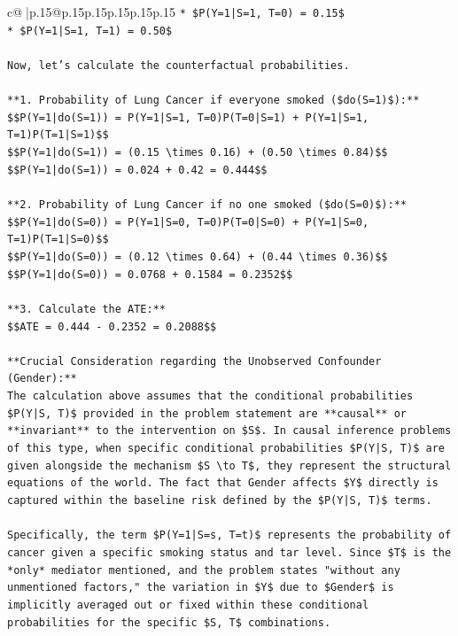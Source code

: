 \documentclass{article}
\begin{document}
{\begin{supertabular}{c@{$\;$}|p{.15\linewidth}@{}p{.15\linewidth}p{.15\linewidth}p{.15\linewidth}p{.15\linewidth}p{.15\linewidth}}
{{{\texttt{*   \$P(Y=1|S=1, T=0) = 0.15\$} \\
\texttt{*   \$P(Y=1|S=1, T=1) = 0.50\$} \\
\\ 
\texttt{Now, let's calculate the counterfactual probabilities.} \\
\\ 
\texttt{**1. Probability of Lung Cancer if everyone smoked (\$do(S=1)\$):**} \\
\texttt{\$\$P(Y=1|do(S=1)) = P(Y=1|S=1, T=0)P(T=0|S=1) + P(Y=1|S=1, T=1)P(T=1|S=1)\$\$} \\
\texttt{\$\$P(Y=1|do(S=1)) = (0.15 \textbackslash{}times 0.16) + (0.50 \textbackslash{}times 0.84)\$\$} \\
\texttt{\$\$P(Y=1|do(S=1)) = 0.024 + 0.42 = 0.444\$\$} \\
\\ 
\texttt{**2. Probability of Lung Cancer if no one smoked (\$do(S=0)\$):**} \\
\texttt{\$\$P(Y=1|do(S=0)) = P(Y=1|S=0, T=0)P(T=0|S=0) + P(Y=1|S=0, T=1)P(T=1|S=0)\$\$} \\
\texttt{\$\$P(Y=1|do(S=0)) = (0.12 \textbackslash{}times 0.64) + (0.44 \textbackslash{}times 0.36)\$\$} \\
\texttt{\$\$P(Y=1|do(S=0)) = 0.0768 + 0.1584 = 0.2352\$\$} \\
\\ 
\texttt{**3. Calculate the ATE:**} \\
\texttt{\$\$ATE = 0.444 {-} 0.2352 = 0.2088\$\$} \\
\\ 
\texttt{**Crucial Consideration regarding the Unobserved Confounder (Gender):**} \\
\texttt{The calculation above assumes that the conditional probabilities \$P(Y|S, T)\$ provided in the problem statement are **causal** or **invariant** to the intervention on \$S\$. In causal inference problems of this type, when specific conditional probabilities \$P(Y|S, T)\$ are given alongside the mechanism \$S \textbackslash{}to T\$, they represent the structural equations of the world. The fact that Gender affects \$Y\$ directly is captured within the baseline risk defined by the \$P(Y|S, T)\$ terms.} \\
\\ 
\texttt{Specifically, the term \$P(Y=1|S=s, T=t)\$ represents the probability of cancer given a specific smoking status and tar level. Since \$T\$ is the *only* mediator mentioned, and the problem states "without any unmentioned factors," the variation in \$Y\$ due to \$Gender\$ is implicitly averaged out or fixed within these conditional probabilities for the specific \$S, T\$ combinations.} \\
}}}
\end{supertabular}}
\end{document}
